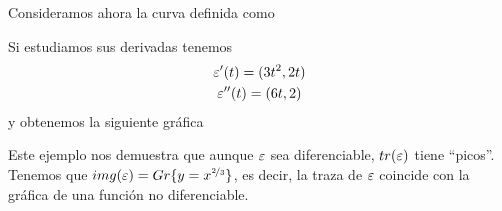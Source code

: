 \begin{ejemplo}
    Consideramos ahora la curva definida como

    Si estudiamos sus derivadas tenemos
    \begin{gather*}
        \varepsilon'(t) = (3t^2, 2t)\\
        \varepsilon''(t) = (6t,2)
    \end{gather*}
    y obtenemos la siguiente gráfica

    \begin{center}
    \end{center}

    Este ejemplo nos demuestra que aunque $\varepsilon$ sea diferenciable, $tr(\varepsilon)$ tiene ``picos''. Tenemos que $img(\varepsilon) = Gr\{y=x^{\nicefrac{2}{3}}\}$, es decir, la traza de $\varepsilon$ coincide con la gráfica de una función no diferenciable.
\end{ejemplo}

